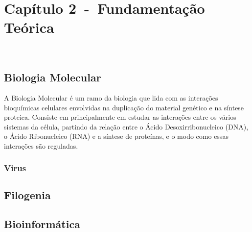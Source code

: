 
\setlength{\parskip}{0.3cm}

\chapter{Capítulo 2~-~Fundamentação Teórica}~\label{ch:fundamentacao}

\section{Biologia Molecular}
A Biologia Molecular é um ramo da biologia que lida com as interações bioquímicas celulares envolvidas na duplicação do material genético e na síntese proteica. Consiste em principalmente em estudar as interações entre os vários sistemas da célula, partindo da relação entre o Ácido Desoxirribonucleico (DNA), o Ácido Ribonucleico (RNA) e a síntese de proteínas, e o modo como essas interações são reguladas.

\subsection{Virus}

\section{Filogenia}

\section{Bioinformática}



